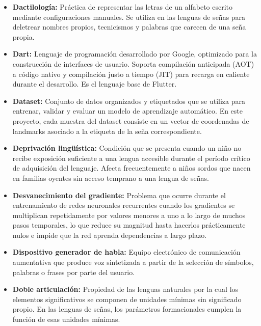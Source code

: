 \begin{itemize}
    \item[] \textbf{Dactilología:} Práctica de representar las letras de un alfabeto escrito mediante configuraciones manuales. Se utiliza en las lenguas de señas para deletrear nombres propios, tecnicismos y palabras que carecen de una seña propia.\\

    \item[] \textbf{Dart:} Lenguaje de programación desarrollado por Google, optimizado para la construcción de interfaces de usuario. Soporta compilación anticipada (AOT) a código nativo y compilación justo a tiempo (JIT) para recarga en caliente durante el desarrollo. Es el lenguaje base de Flutter.\\

    \item[] \textbf{Dataset:} Conjunto de datos organizados y etiquetados que se utiliza para entrenar, validar y evaluar un modelo de aprendizaje automático. En este proyecto, cada muestra del dataset consiste en un vector de coordenadas de landmarks asociado a la etiqueta de la seña correspondiente.\\

    \item[] \textbf{Deprivación lingüística:} Condición que se presenta cuando un niño no recibe exposición suficiente a una lengua accesible durante el período crítico de adquisición del lenguaje. Afecta frecuentemente a niños sordos que nacen en familias oyentes sin acceso temprano a una lengua de señas.\\

    \item[] \textbf{Desvanecimiento del gradiente:} Problema que ocurre durante el entrenamiento de redes neuronales recurrentes cuando los gradientes se multiplican repetidamente por valores menores a uno a lo largo de muchos pasos temporales, lo que reduce su magnitud hasta hacerlos prácticamente nulos e impide que la red aprenda dependencias a largo plazo.\\

    \item[] \textbf{Dispositivo generador de habla:} Equipo electrónico de comunicación aumentativa que produce voz sintetizada a partir de la selección de símbolos, palabras o frases por parte del usuario.\\

    \item[] \textbf{Doble articulación:} Propiedad de las lenguas naturales por la cual los elementos significativos se componen de unidades mínimas sin significado propio. En las lenguas de señas, los parámetros formacionales cumplen la función de esas unidades mínimas.\\


\end{itemize}
